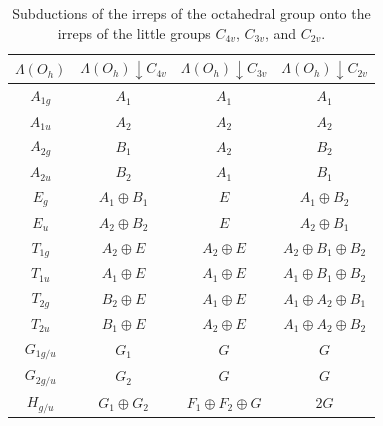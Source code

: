     \begin{table}
        \centering
        \begin{tabular}{c|c|c|c}
            $\Lambda(O_h)$ & $\Lambda(O_h)\downarrow C_{4v}$ & $\Lambda(O_h) \downarrow C_
            {3v}$ & $\Lambda(O_h) \downarrow C_{2v}$ \\
            \hline
            $A_{1g}$ & $A_1$ & $A_1$ & $A_1$ \\
            $A_{1u}$ & $A_2$ & $A_2$ & $A_2$ \\
            $A_{2g}$ & $B_1$ & $A_2$ & $B_2$ \\
            $A_{2u}$ & $B_2$ & $A_1$ & $B_1$ \\
            $E_g$ & $A_1 \oplus B_1$ & $E$ & $A_1 \oplus B_2$ \\
            $E_u$ & $A_2 \oplus B_2$ & $E$ & $A_2 \oplus B_1$ \\
            $T_{1g}$ & $A_2 \oplus E$ & $A_2 \oplus E$ & $A_2 \oplus B_1 \oplus B_2$ \\
            $T_{1u}$ & $A_1 \oplus E$ & $A_1 \oplus E$ & $A_1 \oplus B_1 \oplus B_2$ \\
            $T_{2g}$ & $B_2 \oplus E$ & $A_1 \oplus E$ & $A_1 \oplus A_2 \oplus B_1$ \\
            $T_{2u}$ & $B_1 \oplus E$ & $A_2 \oplus E$ & $A_1 \oplus A_2 \oplus B_2$ \\
            $G_{1g/u}$ & $G_1$ & $G$ & $G$ \\
            $G_{2g/u}$ & $G_2$ & $G$ & $G$ \\
            $H_{g/u}$ & $G_1 \oplus G_2$ & $F_1 \oplus F_2 \oplus G$ & $2G$
        \end{tabular}
        \caption{Subductions of the irreps of the octahedral group onto the irreps of the little groups $C_{4v}$, $C_{3v}$, and $C_{2v}$.}
        \label{table:subductions}
    \end{table}
    
